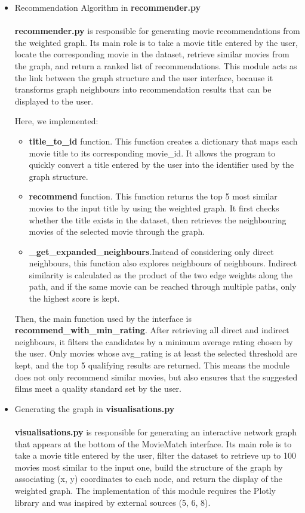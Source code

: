 \documentclass[fontsize=11pt]{article}
\begin{document}
\begin{itemize}
    \item Recommendation Algorithm in \textbf{recommender.py}
    \\
    \\
    \textbf{recommender.py} is responsible for generating movie recommendations from the weighted graph. Its main role is to take a movie title entered by the user, locate the corresponding movie in the dataset, retrieve similar movies from the graph, and return a ranked list of recommendations. This module acts as the link between the graph structure and the user interface, because it transforms graph neighbours into recommendation results that can be displayed to the user.

    Here, we implemented:
    \begin{itemize}
        \item \textbf{title\_to\_id} function. This function creates a dictionary that maps each movie title to its corresponding movie\_id. It allows the program to quickly convert a title entered by the user into the identifier used by the graph structure.
        \item \textbf{recommend} function. This function returns the top 5 most similar movies to the input title by using the weighted graph. It first checks whether the title exists in the dataset, then retrieves the neighbouring movies of the selected movie through the graph. 
        \item \textbf{\_get\_expanded\_neighbours}.Instead of considering only direct neighbours, this function also explores neighbours of neighbours. Indirect similarity is calculated as the product of the two edge weights along the path, and if the same movie can be reached through multiple paths, only the highest score is kept.
    \end{itemize}
    Then, the main function used by the interface is \textbf{recommend\_with\_min\_rating}. After retrieving all direct and indirect neighbours, it filters the candidates by a minimum average rating chosen by the user. Only movies whose avg\_rating is at least the selected threshold are kept, and the top 5 qualifying results are returned. This means the module does not only recommend similar movies, but also ensures that the suggested films meet a quality standard set by the user.

    \item Generating the graph in \textbf{visualisations.py}
    \\
    \\
    \textbf{visualisations.py} is responsible for generating an interactive network graph that appears at the bottom of the MovieMatch interface. Its main role is to take a movie title entered by the user, filter the dataset to retrieve up to 100 movies most similar to the input one, build the structure of the graph by associating (x, y) coordinates to each node, and return the display of the weighted graph. The implementation of this module requires the Plotly library and was inspired by external sources (5, 6, 8).
    

\end{itemize}
\end{document}

